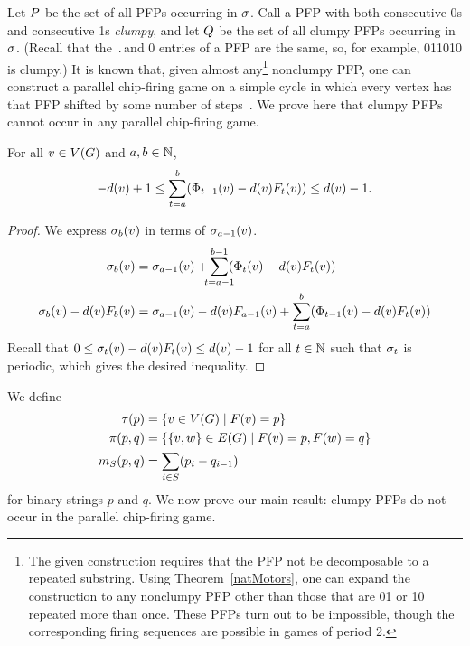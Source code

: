 Let $\pfps$ be the set of all PFPs occurring in $\s$. Call a PFP with both
consecutive 0s and consecutive 1s \emph{clumpy}, and let $\cpfps$ be the set of
all clumpy PFPs occurring in $\s$. (Recall that the $\period$\xth and 0\xth
entries of a PFP are the same, so, for example, 011010 is clumpy.) It is known
that, given almost any\footnote{The given construction requires that the PFP
  not be decomposable to a repeated substring. Using Theorem~\ref{natMotors},
  one can expand the construction to any nonclumpy PFP other than those that
  are 01 or 10 repeated more than once. These PFPs turn out to be impossible,
  though the corresponding firing sequences are possible in games of period 2.}
nonclumpy PFP, one can construct a parallel chip-firing game on a simple cycle
in which every vertex has that PFP shifted by some number of
steps~\cite{cycle}. We prove here that clumpy PFPs cannot occur in any parallel
chip-firing game.

\begin{lemma}\label{strongbg}
For all $v \in \V$ and $a, b \in \nats$,
\begin{equation}\label{local}
  -\deg{v} + 1 \leq \sum_{t=a}^{b}(\receiving{v}{t-1} - \deg{v}\firing{v}{t})
  \leq \deg{v}-1.
\end{equation}
\end{lemma}

\begin{proof}
We express $\chips{v}{b}$ in terms of $\chips{v}{a-1}$.
\begin{align*}
  \chips{v}{b} &= \chips{v}{a-1} +
  \smashoperator{\sum_{t=a-1}}^{b-1}(\receiving{v}{t} - \deg{v}\firing{v}{t})
  \\
  \chips{v}{b} - \deg{v}\firing{v}{b} &= \chips{v}{a-1} -
  \deg{v}\firing{v}{a-1} + \sum_{t=a}^{b}(\receiving{v}{t-1} -
  \deg{v}\firing{v}{t})
\end{align*}
Recall that $0 \leq \chips{v}{t} - \deg{v}\firing{v}{t} \leq \deg{v} - 1$ for
all $t \in \nats$ such that $\pos{t}$ is periodic, which gives the desired
inequality.
\qquad\end{proof}

We define
\begin{align*}
\pfpverts{p} &= {\set{v \in \V}{\pfp{v}=p}} \\
\pfpedges{p}{q} &= {\set{\{v,w\} \in \E}{\pfp{v}=p, \pfp{w} = q}} \\
\misb{S}{p}{q} &= \sum_{i \in S}(p_{i} - q_{i-1})
\end{align*}
for binary strings $p$ and $q$. We now prove our main result: clumpy PFPs do
not occur in the parallel chip-firing game.

